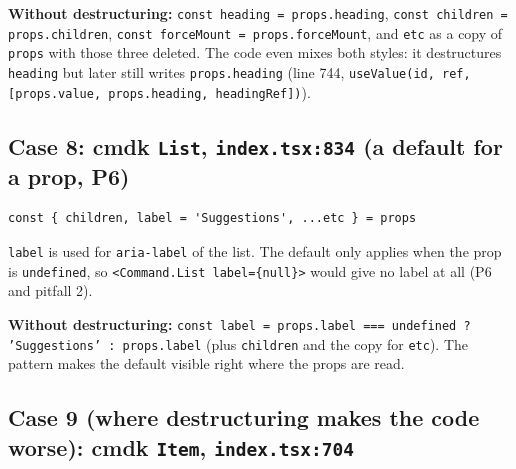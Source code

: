 \documentclass[
  10pt,
]{article}
\begin{document}
\textbf{Without destructuring:}
\texttt{const heading =\allowbreak{} props.\allowbreak{}heading},
\texttt{const children =\allowbreak{} props.\allowbreak{}children},
\texttt{const forceMount =\allowbreak{} props.\allowbreak{}forceMount},
and \texttt{etc} as a copy of \texttt{props} with those three deleted.
The code even mixes both styles: it destructures \texttt{heading} but
later still writes \texttt{props.\allowbreak{}heading} (line 744,
\texttt{useValue(\allowbreak{}id,\allowbreak{} ref,\allowbreak{} [\allowbreak{}props.\allowbreak{}value,\allowbreak{} props.\allowbreak{}heading,\allowbreak{} headingRef])}).

\hypertarget{case-8-cmdk-list-indextsx834-a-default-for-a-prop-p6}{%
\subsection{\texorpdfstring{Case 8: cmdk \texttt{List},
\texttt{index.\allowbreak{}tsx:\allowbreak{}834} (a default for a prop,
P6)}{Case 8: cmdk ,  (a default for a prop, P6)}}\label{case-8-cmdk-list-indextsx834-a-default-for-a-prop-p6}}

\begin{verbatim}
const { children, label = 'Suggestions', ...etc } = props
\end{verbatim}

\texttt{label} is used for \texttt{aria-label} of the list. The default
only applies when the prop is \texttt{undefined}, so
\texttt{<Command.\allowbreak{}List label=\allowbreak{}\{null\}>} would
give no label at all (P6 and pitfall 2).

\textbf{Without destructuring:}
\texttt{const label =\allowbreak{} props.\allowbreak{}label =\allowbreak{}=\allowbreak{}=\allowbreak{} undefined ? 'Suggestions' :\allowbreak{} props.\allowbreak{}label}
(plus \texttt{children} and the copy for \texttt{etc}). The pattern
makes the default visible right where the props are read.

\hypertarget{case-9-where-destructuring-makes-the-code-worse-cmdk-item-indextsx704}{%
\subsection{\texorpdfstring{Case 9 (where destructuring makes the code
worse): cmdk \texttt{Item},
\texttt{index.\allowbreak{}tsx:\allowbreak{}704}}{Case 9 (where destructuring makes the code worse): cmdk , }}\label{case-9-where-destructuring-makes-the-code-worse-cmdk-item-indextsx704}}
\end{document}

